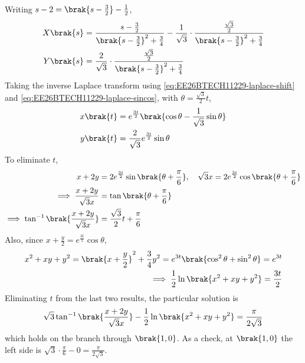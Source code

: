 \begin{enumerate}[label=\thesubsection.\arabic*, ref=\thesubsection.\theenumi]
Writing $s - 2 = \brak{s - \frac{3}{2}} - \frac{1}{2}$,
\begin{align}
	X\brak{s} &= \frac{s - \frac{3}{2}}{\brak{s - \frac{3}{2}}^2 + \frac{3}{4}} - \frac{1}{\sqrt{3}}\cdot\frac{\frac{\sqrt{3}}{2}}{\brak{s - \frac{3}{2}}^2 + \frac{3}{4}}
	\\
	Y\brak{s} &= \frac{2}{\sqrt{3}}\cdot\frac{\frac{\sqrt{3}}{2}}{\brak{s - \frac{3}{2}}^2 + \frac{3}{4}}
\end{align}
Taking the inverse Laplace transform using \eqref{eq:EE26BTECH11229-laplace-shift} and \eqref{eq:EE26BTECH11229-laplace-sincos}, with $\theta = \frac{\sqrt{3}}{2}t$,
\begin{align}
	x\brak{t} &= e^{\frac{3t}{2}}\brak{\cos\theta - \frac{1}{\sqrt{3}}\sin\theta}
	\\
	y\brak{t} &= \frac{2}{\sqrt{3}}e^{\frac{3t}{2}}\sin\theta
\end{align}
To eliminate $t$,
\begin{align}
	x + 2y &= 2e^{\frac{3t}{2}}\sin\brak{\theta + \frac{\pi}{6}}, \quad \sqrt{3}x = 2e^{\frac{3t}{2}}\cos\brak{\theta + \frac{\pi}{6}}
	\\
	\implies \frac{x + 2y}{\sqrt{3}x} &= \tan\brak{\theta + \frac{\pi}{6}}
	\\
	\implies \tan^{-1}\brak{\frac{x + 2y}{\sqrt{3}x}} &= \frac{\sqrt{3}}{2}t + \frac{\pi}{6}
\end{align}
Also, since $x + \frac{y}{2} = e^{\frac{3t}{2}}\cos\theta$,
\begin{align}
	x^2 + xy + y^2 = \brak{x + \frac{y}{2}}^2 + \frac{3}{4}y^2 = e^{3t}\brak{\cos^2\theta + \sin^2\theta} = e^{3t}
	\\
	\implies \frac{1}{2}\ln\brak{x^2 + xy + y^2} = \frac{3t}{2}
\end{align}
Eliminating $t$ from the last two results, the particular solution is
\begin{align}
	\sqrt{3}\tan^{-1}\brak{\frac{x + 2y}{\sqrt{3}x}} - \frac{1}{2}\ln\brak{x^2 + xy + y^2} = \frac{\pi}{2\sqrt{3}}
\end{align}
which holds on the branch through $\brak{1, 0}$. As a check, at $\brak{1, 0}$ the left side is $\sqrt{3}\cdot\frac{\pi}{6} - 0 = \frac{\pi}{2\sqrt{3}}$.


\end{enumerate}
